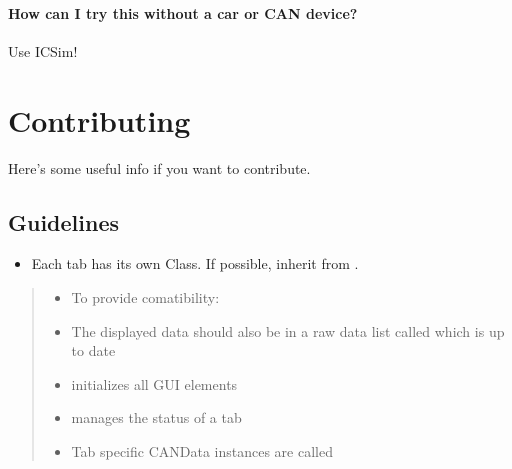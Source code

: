 \documentclass[letterpaper,10pt,english]{sphinxmanual}
\begin{document}
\subsubsection{How can I try this without a car or CAN device?}
\label{\detokenize{manual.filtertab:how-can-i-try-this-without-a-car-or-can-device}}
Use ICSim!


\chapter{Contributing}
\label{\detokenize{contributing:contributing}}\label{\detokenize{contributing::doc}}
Here’s some useful info if you want to contribute.


\section{Guidelines}
\label{\detokenize{contributing:guidelines}}\begin{itemize}
\item {} 
Each tab has its own Class. If possible, inherit from {\hyperref[\detokenize{src:src.AbstractTab.AbstractTab}]{}}.

\end{itemize}
\begin{quote}
\begin{itemize}
\item {} 
To provide comatibility:

\end{itemize}
\begin{itemize}
\item {} 
The displayed data should also be in a raw data list called  which is  up to date

\item {} 
 initializes all GUI elements

\item {} 
 manages the status of a tab

\item {} 
Tab specific CANData instances are called 

\end{itemize}
\end{quote}
\end{document}
